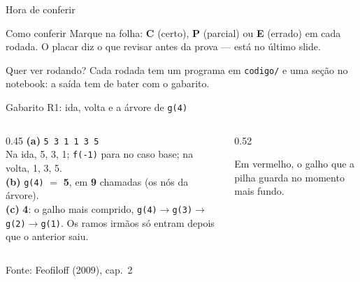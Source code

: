 \documentclass[aspectratio=169]{beamer}
\newcommand{\fonte}[1]{\vfill\hfill{\scriptsize\textcolor{UFSGray}{Fonte: #1}}}
\begin{document}
\begin{frame}{Hora de conferir}
  \begin{block}{Como conferir}
    Marque na folha: \textbf{C} (certo), \textbf{P} (parcial) ou \textbf{E}
    (errado) em cada rodada. O placar diz o que revisar antes da prova ---
    está no último slide.
  \end{block}
  \begin{block}{Quer ver rodando?}
    Cada rodada tem um programa em \texttt{codigo/} e uma seção no
    notebook: a saída tem de bater com o gabarito.
  \end{block}
\end{frame}

\begin{frame}{Gabarito R1: ida, volta e a árvore de \texttt{g(4)}}
  \begin{columns}[T]
    \begin{column}{0.45\textwidth}
      \small
      \textbf{(a)} \texttt{\large 5 3 1 1 3 5}\\[0.3em]
      Na ida, 5, 3, 1; \texttt{f(-1)} para no caso base; na volta, 1, 3, 5.
      \\[0.6em]
      \textbf{(b)} \texttt{g(4)} $=$ \textbf{5}, em \textbf{9} chamadas
      (os nós da árvore).\\[0.6em]
      \textbf{(c)} \textbf{4}: o galho mais comprido,
      \texttt{g(4)}$\to$\texttt{g(3)}$\to$\texttt{g(2)}$\to$\texttt{g(1)}.
      Os ramos irmãos só entram depois que o anterior saiu.
    \end{column}
    \begin{column}{0.52\textwidth}
      \begin{center}
      \end{center}
      \scriptsize\textcolor{UFSGray}{Em vermelho, o galho que a pilha guarda
      no momento mais fundo.}
    \end{column}
  \end{columns}
  \fonte{Feofiloff (2009), cap.~2~\cite{feofiloff2009algoritmos}}
\end{frame}
\end{document}
